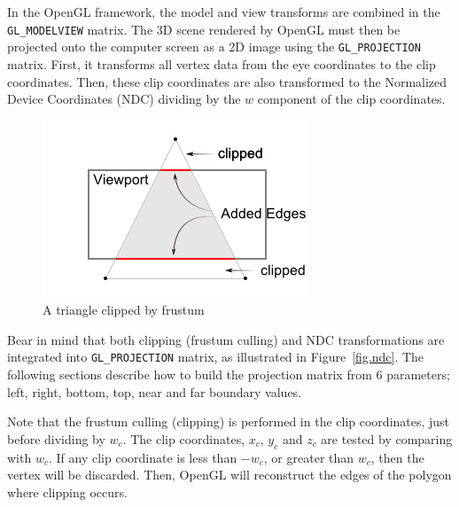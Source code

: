 
In the OpenGL framework, the model and view transforms are combined in the \verb|GL_MODELVIEW| matrix. The 3D scene rendered by OpenGL must then be projected onto the computer screen as a 2D image using the \verb|GL_PROJECTION| matrix. First, it transforms all vertex data from the eye coordinates to the clip coordinates. Then, these clip coordinates are also transformed to the Normalized Device Coordinates (NDC) dividing by the $w$ component of the clip coordinates.

\begin{figure}[h!]
\centering
\includegraphics[width=0.9\linewidth,keepaspectratio=true]{figs/gl_frustumclip.png}
\caption{A triangle clipped by frustum}
\label{fig.clipping}
\end{figure}

Bear in mind that both clipping (frustum culling) and NDC transformations are integrated into \verb|GL_PROJECTION| matrix, as illustrated in Figure~\ref{fig.ndc}. The following sections describe how to build the projection matrix from 6 parameters; left, right, bottom, top, near and far boundary values.

Note that the frustum culling (clipping) is performed in the clip coordinates, just before dividing by $w_c$. The clip coordinates, $x_c$, $y_c$ and $z_c$ are tested by comparing with $w_c$. If any clip coordinate is less than $-w_c$, or greater than $w_c$, then the vertex will be discarded. Then, OpenGL will reconstruct the edges of the polygon where clipping occurs.

